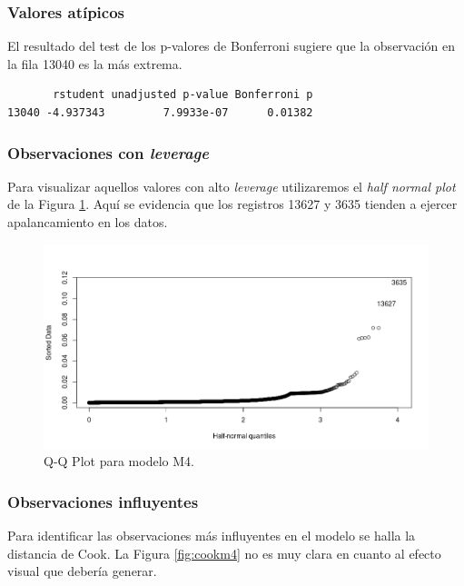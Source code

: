 \documentclass[10pt,letterpaper]{article}
\begin{document}
	\subsubsection{Valores atípicos}
El resultado del test de los p-valores de Bonferroni sugiere que la observación en la fila 13040 es la más extrema.

\begin{verbatim}
       rstudent unadjusted p-value Bonferroni p
13040 -4.937343         7.9933e-07      0.01382
\end{verbatim}

	\subsubsection{Observaciones con \textit{leverage}}
Para visualizar aquellos valores con alto \textit{leverage} utilizaremos el \textit{half normal plot} de la Figura \ref{fig:hfm4}. Aquí se evidencia que los registros 13627 y 3635 tienden a ejercer apalancamiento en los datos.

\begin{figure}[!htbp]
	\includegraphics[scale=0.5]{hfm4.png}
	\caption{Q-Q Plot para modelo M4.}
	\label{fig:hfm4}
\end{figure}

	\subsubsection{Observaciones influyentes}
	Para identificar las observaciones más influyentes en el modelo se halla la distancia de Cook. La Figura \ref{fig:cookm4} no es muy clara en cuanto al efecto visual que debería generar.
	
\end{document}
